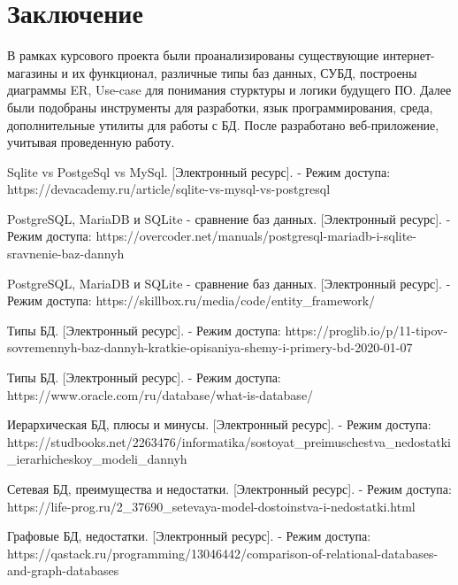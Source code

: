 \chapter*{Заключение}
В рамках курсового проекта были проанализированы существующие интернет-магазины и их функционал, различные типы баз данных, СУБД, построены диаграммы ER, Use-case для понимания стурктуры и логики будущего ПО. Далее были подобраны инструменты для разработки, язык программирования, среда, дополнительные утилиты для работы с БД. После разработано веб-приложение, учитывая проведенную работу.

\begin{thebibliography}{3}
  Sqlite vs PostgeSql vs MySql. [Электронный ресурс]. - Режим доступа:  https://devacademy.ru/article/sqlite-vs-mysql-vs-postgresql
  
  PostgreSQL, MariaDB и SQLite - сравнение баз данных. [Электронный ресурс]. - Режим доступа:  https://overcoder.net/manuals/postgresql-mariadb-i-sqlite-sravnenie-baz-dannyh
  
  PostgreSQL, MariaDB и SQLite - сравнение баз данных. [Электронный ресурс]. - Режим доступа: 
  https://skillbox.ru/media/code/entity\_framework/
  
  Типы БД. [Электронный ресурс]. - Режим доступа:  https://proglib.io/p/11-tipov-sovremennyh-baz-dannyh-kratkie-opisaniya-shemy-i-primery-bd-2020-01-07
  
  Типы БД. [Электронный ресурс]. - Режим доступа: https://www.oracle.com/ru/database/what-is-database/
  
  Иерархическая БД, плюсы и минусы. [Электронный ресурс]. - Режим доступа:  https://studbooks.net/2263476/informatika/sostoyat\_preimuschestva\_nedostatki\_ierarhicheskoy\_modeli\_dannyh
  
  Сетевая БД, преимущества и недостатки. [Электронный ресурс]. - Режим доступа:  https://life-prog.ru/2\_37690\_setevaya-model-dostoinstva-i-nedostatki.html
  
  Графовые БД, недостатки. [Электронный ресурс]. - Режим доступа: https://qastack.ru/programming/13046442/comparison-of-relational-databases-and-graph-databases
\end{thebibliography}